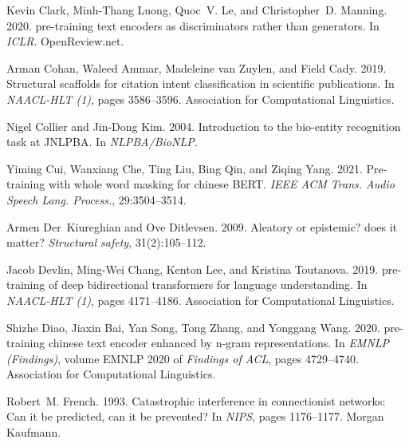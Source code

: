 \documentclass[11pt]{article}
\begin{document}
\begin{thebibliography}{59}
Kevin Clark, Minh{-}Thang Luong, Quoc~V. Le, and Christopher~D. Manning. 2020.
 pre-training text encoders as discriminators rather than
  generators.
\newblock In \emph{{ICLR}}. OpenReview.net.

Arman Cohan, Waleed Ammar, Madeleine van Zuylen, and Field Cady. 2019.
\newblock Structural scaffolds for citation intent classification in scientific
  publications.
\newblock In \emph{{NAACL-HLT} {(1)}}, pages 3586--3596. Association for
  Computational Linguistics.

Nigel Collier and Jin{-}Dong Kim. 2004.
\newblock Introduction to the bio-entity recognition task at {JNLPBA}.
\newblock In \emph{NLPBA/BioNLP}.

Yiming Cui, Wanxiang Che, Ting Liu, Bing Qin, and Ziqing Yang. 2021.
\newblock Pre-training with whole word masking for chinese {BERT}.
\newblock \emph{{IEEE} {ACM} Trans. Audio Speech Lang. Process.},
  29:3504--3514.

Armen Der~Kiureghian and Ove Ditlevsen. 2009.
\newblock Aleatory or epistemic? does it matter?
\newblock \emph{Structural safety}, 31(2):105--112.

Jacob Devlin, Ming{-}Wei Chang, Kenton Lee, and Kristina Toutanova. 2019.
 pre-training of deep bidirectional transformers for language
  understanding.
\newblock In \emph{{NAACL-HLT} {(1)}}, pages 4171--4186. Association for
  Computational Linguistics.

Shizhe Diao, Jiaxin Bai, Yan Song, Tong Zhang, and Yonggang Wang. 2020.
 pre-training chinese text encoder enhanced by n-gram
  representations.
\newblock In \emph{{EMNLP} (Findings)}, volume {EMNLP} 2020 of \emph{Findings
  of {ACL}}, pages 4729--4740. Association for Computational Linguistics.

Robert~M. French. 1993.
\newblock Catastrophic interference in connectionist networks: Can it be
  predicted, can it be prevented?
\newblock In \emph{{NIPS}}, pages 1176--1177. Morgan Kaufmann.


\end{thebibliography}
\end{document}
